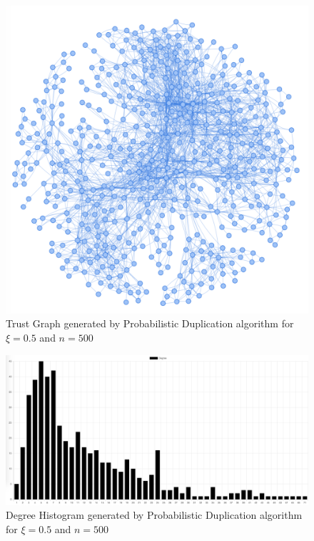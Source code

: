 \begin{figure}[h!]
    \includegraphics[width=\textwidth]{img/propDup500Graph.png}
    \centering
    \caption{Trust Graph generated by Probabilistic Duplication algorithm for $\xi=0.5$ and $n = 500$}
    \label{fig:propdup500graph}
\end{figure}

\begin{figure}[h!]
    \includegraphics[width=\textwidth]{img/propDup500Hist.png}
    \centering
    \caption{Degree Histogram generated by Probabilistic Duplication algorithm for $\xi=0.5$ and $n = 500$}
    \label{fig:propdup500histogram}
\end{figure} 

